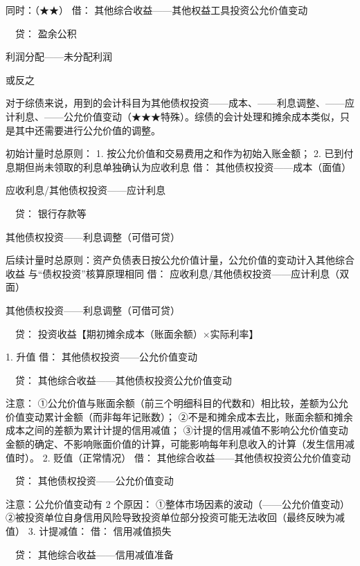 \documentclass[UTF8,12pt]{ctexart}
\newenvironment{Dr}{\noindent 借：}{\par}
\newenvironment{Cr}{\noindent \ \ 贷：}{\par}
\numberwithin{equation}{section} %
\numberwithin{figure}{section}
\numberwithin{table}{section}
\begin{document}
	同时：（★★）
	\begin{Dr}
		其他综合收益——其他权益工具投资公允价值变动
	\end{Dr}
	\begin{Cr}
		盈余公积
		
		利润分配——未分配利润
	\end{Cr}
	或反之
	
	对于综债来说，用到的会计科目为其他债权投资——成本、——利息调整、——应计利息、——公允价值变动（★★★特殊）。综债的会计处理和摊余成本类似，只是其中还需要进行公允价值的调整。
	
	初始计量时总原则：
	1.	按公允价值和交易费用之和作为初始入账金额；
	2.	已到付息期但尚未领取的利息单独确认为应收利息
	\begin{Dr}
		其他债权投资——成本（面值）
		
		应收利息/其他债权投资——应计利息
	\end{Dr}
	\begin{Cr}
		银行存款等
		
		其他债权投资——利息调整（可借可贷）
	\end{Cr}

	
	
	后续计量时总原则：资产负债表日按公允价值计量，公允价值的变动计入其他综合收益
	与“债权投资”核算原理相同
	\begin{Dr}
		应收利息/其他债权投资——应计利息（双面）
		
		其他债权投资——利息调整（可借可贷）
	\end{Dr}
	\begin{Cr}
		投资收益【期初摊余成本（账面余额）×实际利率】
	\end{Cr}

	1.	升值
	\begin{Dr}
		其他债权投资——公允价值变动
	\end{Dr}
	\begin{Cr}
		其他综合收益——其他债权投资公允价值变动
	\end{Cr}
	注意：
	①公允价值与账面余额（前三个明细科目的代数和）相比较，差额为公允价值变动累计金额（而非每年记账数）；
	②不是和摊余成本去比，账面余额和摊余成本之间的差额为累计计提的信用减值；
	③计提的信用减值不影响公允价值变动金额的确定、不影响账面价值的计算，可能影响每年利息收入的计算（发生信用减值时）。
	2.	贬值（正常情况）
	\begin{Dr}
		其他综合收益——其他债权投资公允价值变动
	\end{Dr}
	\begin{Cr}
		其他债权投资——公允价值变动
	\end{Cr}
	注意：公允价值变动有 2 个原因：
	①整体市场因素的波动（——公允价值变动）
	②被投资单位自身信用风险导致投资单位部分投资可能无法收回（最终反映为减值）
	3.	计提减值：
	\begin{Dr}
		信用减值损失
	\end{Dr}
	\begin{Cr}
		其他综合收益——信用减值准备
	\end{Cr}
\end{document}
